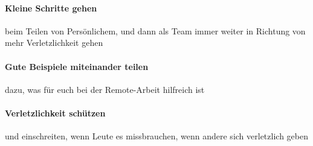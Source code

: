 \paragraph{Kleine Schritte gehen} beim Teilen von Persönlichem, und dann als Team immer weiter in Richtung von mehr Verletzlichkeit gehen

\paragraph{Gute Beispiele miteinander teilen} dazu, was für euch bei der Remote-Arbeit hilfreich ist

\paragraph{Verletzlichkeit schützen} und einschreiten, wenn Leute es missbrauchen, wenn andere sich verletzlich geben
